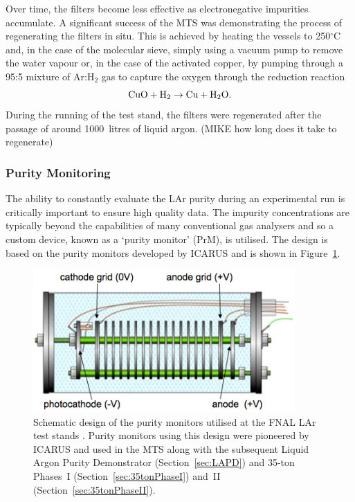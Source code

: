 Over time, the filters become less effective as electronegative impurities accumulate.  A significant success of the MTS was demonstrating the process of regenerating the filters in situ.  This is achieved by heating the vessels to 250$^{\circ}$C and, in the case of the molecular sieve, simply using a vacuum pump to remove the water vapour or, in the case of the activated copper, by pumping through a 95:5 mixture of Ar:H$_2$ gas to capture the oxygen through the reduction reaction
\begin{equation}
  \textnormal{CuO} + \textnormal{H}_2 \rightarrow \textnormal{Cu} + \textnormal{H}_2\textnormal{O}.
\end{equation}
During the running of the test stand, the filters were regenerated after the passage of around 1000~litres of liquid argon. (MIKE how long does it take to regenerate)

\subsubsection{Purity Monitoring}\label{sec:PurityMonitoring}

The ability to constantly evaluate the LAr purity during an experimental run is critically important to ensure high quality data.  The impurity concentrations are typically beyond the capabilities of many conventional gas analysers and so a custom device, known as a `purity monitor' (PrM), is utilised.  The design is based on the purity monitors developed by ICARUS \cite{ICARUSPurityMonitor} and is shown in Figure~\ref{fig:PurityMonitor}.

\begin{figure}
  \centering
  \includegraphics[width=10cm]{PurityMonitor.png}
  \caption[Schematic design of the purity monitors utilised at the FNAL LAr test stands.]{Schematic design of the purity monitors utilised at the FNAL LAr test stands \cite{35tonPhaseI2014}.  Purity monitors using this design were pioneered by ICARUS \cite{ICARUSPurityMonitor} and used in the MTS along with the subsequent Liquid Argon Purity Demonstrator (Section~\ref{sec:LAPD}) and 35-ton Phases~I (Section~\ref{sec:35tonPhaseI}) and~II (Section~\ref{sec:35tonPhaseII}).}
  \label{fig:PurityMonitor}
\end{figure}

